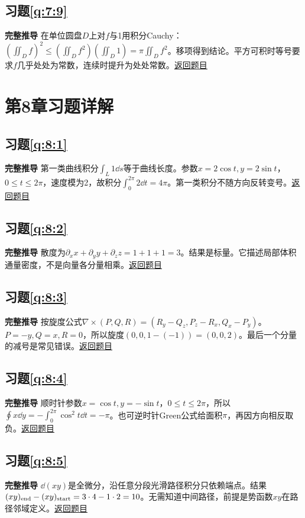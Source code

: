 \subsection*{习题\ref{q:7:9}}\label{a:7:9}\textbf{完整推导} 在单位圆盘$D$上对$f$与1用积分Cauchy：$(\iint_Df)^2\le(\iint_Df^2)(\iint_D1)=\pi\iint_Df^2$。移项得到结论。平方可积时等号要求$f$几乎处处为常数，连续时提升为处处常数。\quad\hyperref[q:7:9]{返回题目}

\section{第8章习题详解}

\subsection*{习题\ref{q:8:1}}\label{a:8:1}\textbf{完整推导} 第一类曲线积分$\int_L1\dd s$等于曲线长度。参数$x=2\cos t,y=2\sin t$，$0\le t\le2\pi$，速度模为2，故积分$\int_0^{2\pi}2\dd t=4\pi$。第一类积分不随方向反转变号。\quad\hyperref[q:8:1]{返回题目}

\subsection*{习题\ref{q:8:2}}\label{a:8:2}\textbf{完整推导} 散度为$\partial_xx+\partial_yy+\partial_zz=1+1+1=3$。结果是标量。它描述局部体积通量密度，不是向量各分量相乘。\quad\hyperref[q:8:2]{返回题目}

\subsection*{习题\ref{q:8:3}}\label{a:8:3}\textbf{完整推导} 按旋度公式$\nabla\times(P,Q,R)=(R_y-Q_z,P_z-R_x,Q_x-P_y)$。$P=-y,Q=x,R=0$，所以旋度$(0,0,1-(-1))=(0,0,2)$。最后一个分量的减号是常见错误。\quad\hyperref[q:8:3]{返回题目}

\subsection*{习题\ref{q:8:4}}\label{a:8:4}\textbf{完整推导} 顺时针参数$x=\cos t,y=-\sin t$，$0\le t\le2\pi$，所以$\oint x\dd y=-\int_0^{2\pi}\cos^2t\dd t=-\pi$。也可逆时针Green公式给面积$\pi$，再因方向相反取负。\quad\hyperref[q:8:4]{返回题目}

\subsection*{习题\ref{q:8:5}}\label{a:8:5}\textbf{完整推导} $\dd(xy)$是全微分，沿任意分段光滑路径积分只依赖端点。结果$(xy)_{\rm end}-(xy)_{\rm start}=3\cdot4-1\cdot2=10$。无需知道中间路径，前提是势函数$xy$在路径邻域定义。\quad\hyperref[q:8:5]{返回题目}

